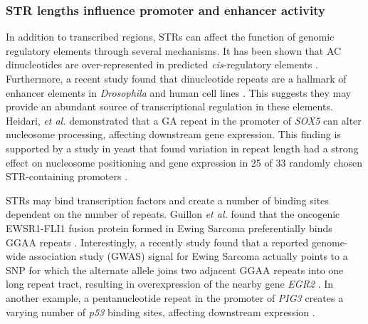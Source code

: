 \subsubsection{STR lengths influence promoter and enhancer activity}
In addition to transcribed regions, STRs can affect the function of genomic regulatory elements through several mechanisms. It has been shown that AC dinucleotides are over-represented in predicted \emph{cis}-regulatory elements \cite{RockmanWray2002}. Furthermore, a recent study found that dinucleotide repeats are a hallmark of enhancer elements in \emph{Drosophila} and human cell lines \cite{Yanez-CunaArnoldStampfelEtAl2014}. This suggests they may provide an abundant source of transcriptional regulation in these elements. Heidari, \emph{et al.} \cite{HeidariNarimanSalehFamEsmaeilzadeh-GharehdaghiEtAl2012} demonstrated that a GA repeat in the promoter of \emph{SOX5} can alter nucleosome processing, affecting downstream gene expression. This finding is supported by a study in yeast that found variation in repeat length had a strong effect on nucleosome positioning and gene expression in 25 of 33 randomly chosen STR-containing promoters \cite{VincesLegendreCaldaraEtAl2009}. 

STRs may bind transcription factors and create a number of binding sites dependent on the number of repeats. Guillon \emph{et al.} found that the oncogenic EWSR1-FLI1 fusion protein formed in Ewing Sarcoma preferentially binds GGAA repeats \cite{GuillonTirodeBoevaEtAl2009}. Interestingly, a recently study found that a reported genome-wide association study (GWAS) signal for Ewing Sarcoma actually points to a SNP for which the alternate allele joins two adjacent GGAA repeats into one long repeat tract, resulting in overexpression of the nearby gene \emph{EGR2} \cite{GrunewaldBernardGilardi-HebenstreitEtAl2015}. In another example, a pentanucleotide repeat in the promoter of \emph{PIG3} creates a varying number of \emph{p53} binding sites, affecting downstream expression \cite{ContenteDittmerKochEtAl2002}.



